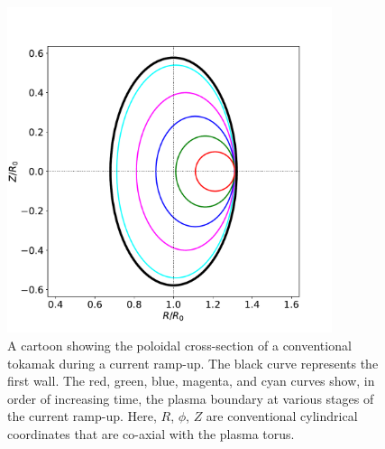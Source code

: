 \documentclass{iopjournal}
\begin{document}
\begin{figure}
\centerline{\includegraphics[width=0.85\textwidth]{Figure1.pdf}}
\caption{A cartoon showing the poloidal cross-section of a conventional tokamak during a current ramp-up. The black curve represents the first wall. The
red, green, blue, magenta, and cyan curves show, in order of increasing time, the plasma boundary at various stages of the current ramp-up.
Here, $R$, $\phi$, $Z$ are conventional cylindrical coordinates that are co-axial with the plasma torus. }\label{fig1}
\end{figure}
\end{document}
